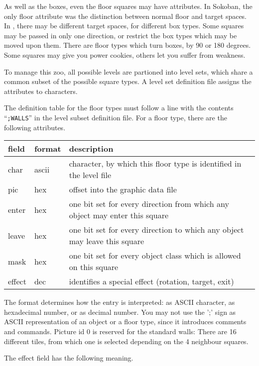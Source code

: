 As well as the boxes, even the floor squares may have attributes.
In Sokoban, the only floor attribute was the distinction between normal floor
and target spaces.
In \xsok, there may be different target spaces, for different box types.
Some squares may be passed in only one direction, or restrict the box types
which may be moved upon them.
There are floor types which turn boxes, by 90 or 180 degrees.
Some squares may give you power cookies, others let you suffer from weakness.

To manage this zoo, all possible levels are partioned into level sets, which
share a common subset of the possible square types.
A level set definition file assigns the attributes to characters.

The definition table for the floor types must follow a line with
the contents ``{\tt ;WALLS}'' in the level subset definition file.
For a floor type, there are the following attributes.

\begin{center}
  \begin{tabular}{|l|l|l|}
\hline
field & format & description\\
\hline
char   & ascii & character, by which this floor type is identified in the level file\\
pic    & hex & offset into the graphic data file\\
enter  & hex & one bit set for every direction from which any object may enter this square\\
leave  & hex & one bit set for every direction to which any object may leave this square\\
mask   & hex & one bit set for every object class which is allowed on this square\\
effect & dec & identifies a special effect (rotation, target, exit)\\
\hline
\end{tabular}
\end{center}

The format determines how the entry is interpreted: as ASCII character, as
hexadecimal number, or as decimal number.
You may not use the ';' sign as ASCII representation of an object or a floor
type, since it introduces comments and commands.
Picture id 0 is reserved for the standard walls: There are 16 different
tiles, from which one is selected depending on the 4 neighbour squares.

The effect field has the following meaning.

